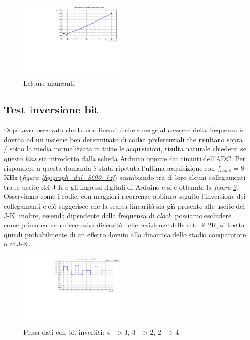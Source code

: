 \documentclass[journal]{IEEEtran}
\begin{document}
\begin{figure}[H]%
\begin{center}
\includegraphics[width=0.50\textwidth]{analysis/output/dnl_sigma_pdf}
\caption{Letture mancanti}
\label{fig:graph_dnl_sigma}
\end{center}
\end{figure}

\subsection{Test inversione bit}
Dopo aver osservato che la non linearità che emerge al crescere della frequenza è dovuta ad un insieme ben determinato di codici preferenziali che risultano sopra / sotto la media normalizzata in tutte le acquisizioni, risulta naturale chiedersi se questo \textit{bias} sia introdotto dalla scheda Arduino oppure dai circuiti dell'ADC. Per rispondere a questa domanda è stata ripetuta l'ultima acquisizione con $f_{clock}$ = 8 KHz (\textit{figura \ref{fig:graph_dnl_8000_hz}}) scambiando tra di loro alcuni collegamenti tra le uscite dei J-K e gli ingressi digitali di Arduino e si è ottenuta la \textit{figura}  \textit{\ref{fig:graph_dnl_non_lin}}.
Osserviamo come i codici con maggiori ricorrenze abbiano seguito l'inversione dei collegamenti e ciò suggerisce che la scarsa linearità sia già presente alle uscite dei J-K; inoltre, essendo dipendente dalla frequenza di \textit{clock}, possiamo escludere come prima causa un'eccessiva diversità delle resistenze della rete R-2R, si tratta quindi probabilmente di un effetto dovuto alla dinamica dello stadio comparatore o ai J-K. 

\begin{figure}[H]%
\begin{center}
\includegraphics[width=0.48\textwidth]{analysis/output/dnl_non_lin_8000hz_bars.pdf}
\caption{Presa dati con bit invertiti: $ 4->3, \ 3->2, \ 2->4 $}
\label{fig:graph_dnl_non_lin}
\end{center}
\end{figure}
\end{document}
